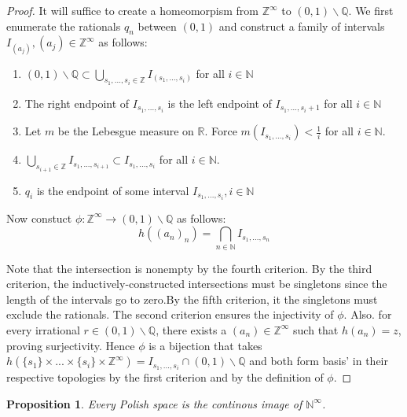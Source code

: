 \documentclass[12pt]{article}
\newtheorem{proposition}{Proposition}[section]
\theoremstyle{remark}
\begin{document}
\begin{proof}
 It will suffice to create a homeomorpism from $\mathbb{Z}^{\infty}$ to $(0,1) \backslash \mathbb{Q}$. We first enumerate the rationals $q_n$ between $(0,1)$ and construct a family of intervals $I_{(a_j)}, (a_j) \in \mathbb{Z}^{\infty}$ as follows:
 \begin{enumerate}
  \item $(0,1) \backslash \mathbb{Q} \subset \bigcup_{s_1,...,s_i \in \mathbb{Z}} I_{(s_1,...,s_i)}$ for all $i \in \mathbb{N}$
  \item The right endpoint of $I_{s_1,...,s_i}$ is the left endpoint of $I_{s_1,...,s_i+1}$ for all $i \in \mathbb{N}$
  \item Let $m$ be the Lebesgue measure on $\mathbb{R}$. Force $m(I_{s_1,...,s_i}) < \frac{1}{i}$ for all $i \in \mathbb{N}$.
  \item $ \bigcup_{s_{i+1} \in \mathbb{Z}} I_{s_1,...,s_{i+1}} \subset I_{s_1,...,s_i}$ for all $i \in \mathbb{N}$.
  \item $q_i$ is the endpoint of some interval $I_{s_1,...,s_i}, i \in \mathbb{N}$
 \end{enumerate}
 
  Now constuct $\phi: \mathbb{Z}^{\infty} \rightarrow (0,1) \backslash \mathbb{Q}$
  as follows:
  $$h((a_n)_n) = \bigcap_{n \in \mathbb{N}} I_{s_1,...,s_n} $$

Note that the intersection is nonempty by the fourth criterion. By the third criterion, the inductively-constructed intersections must be singletons since the length of the intervals go to zero.By the fifth criterion, it the singletons must exclude the rationals. The second criterion ensures the injectivity of $\phi$. Also. for every irrational $r \in (0,1) \backslash \mathbb{Q}$, there exists a $(a_n) \in \mathbb{Z}^{\infty}$ such that $h(a_n) = z$, proving surjectivity. Hence $\phi$ is a bijection that takes $h(\{s_1\} \times ... \times \{s_i\} \times \mathbb{Z}^{\infty}) = I_{s_1,...,s_i} \cap (0,1) \backslash \mathbb{Q}$ and both form basis' in their respective topologies by the first criterion and by the definition of $\phi$.
\end{proof}

\begin{proposition}
Every Polish space is the continous image of $\mathbb{N}^{\infty}$.
\end{proposition}
\end{document}
